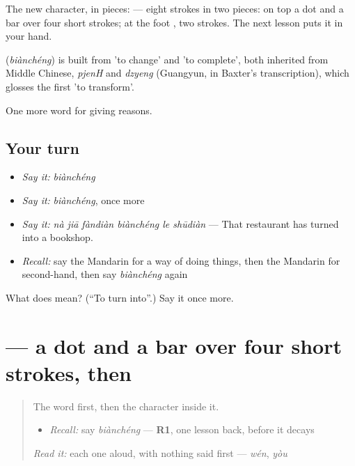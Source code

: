 The new character, in pieces:  — eight strokes in two pieces: on top a dot and a bar over four short strokes; at the foot , two strokes. The next lesson puts it in your hand.

\begin{cousinweb}
\textbf{} (\emph{biànchéng}) is built from  'to change' and  'to complete', both inherited from Middle Chinese, \emph{pjenH} and \emph{dzyeng} (Guangyun, in Baxter's transcription), which glosses the first 'to transform'.
\end{cousinweb}

\begin{grammarlens}[title={What you've built}]
One more word for giving reasons.
\end{grammarlens}

\subsection*{Your turn}
\begin{itemize}
\raggedright
  \item \emph{Say it:} \emph{biànchéng}
  \item \emph{Say it:} \emph{biànchéng}, once more
  \item \emph{Say it:} \emph{nà jiā fàndiàn biànchéng le shūdiàn} — That restaurant has turned into a bookshop.
  \item \emph{Recall:} say the Mandarin for a way of doing things, then the Mandarin for second-hand, then say \emph{biànchéng} again
\end{itemize}

\begin{tcolorbox}[breakable,colback=teal!4,colframe=teal!35!black,title={Before you move on}]
What does  mean? (\textquotedblleft{}To turn into\textquotedblright{}.) Say it once more.
\end{tcolorbox}
\section[\texorpdfstring{\zh{变} (biàn)}{变 (biàn)}]{ — a dot and a bar over four short strokes, then }

\label{lesson:ZH-W386-bian-change}



\begin{quote}
The word first, then the character inside it.

\begin{itemize}
\raggedright
  \item \emph{Recall:} say \emph{biànchéng} — \textbf{R1}, one lesson back, before it decays
\end{itemize}

\begin{quote}
 
\end{quote}

\emph{Read it:} each one aloud, with nothing said first — \emph{wén}, \emph{yòu}
\end{quote}

